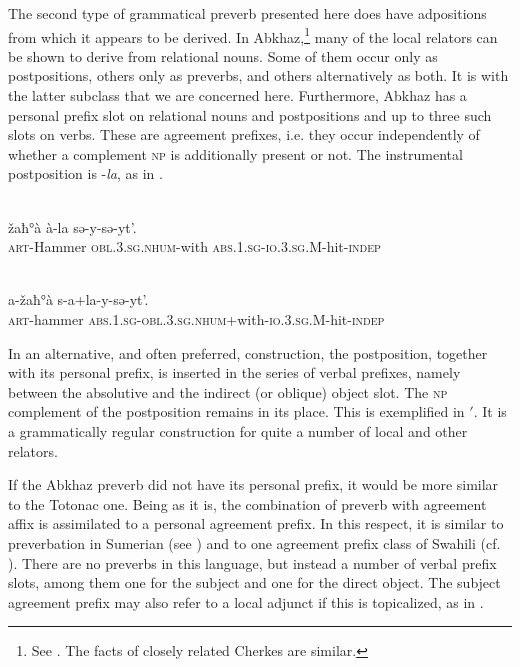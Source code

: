 The second type of grammatical preverb presented here does have adpositions from which it appears to be derived. In Abkhaz,\footnote{See \citet[113--149]{Hewitt1979}. The facts of closely related Cherkes are similar.} many of the local relators can be shown to derive from relational nouns. Some of them occur only as postpositions, others only as preverbs, and others alternatively as both. It is with the latter subclass that we are concerned here. Furthermore, Abkhaz has a personal prefix slot on relational nouns and postpositions and up to three such slots on verbs. These are agreement prefixes, i.e. they occur independently of whether a complement \textsc{np} is additionally present or not. The instrumental postposition is -\textit{la}, as in .

\ea\label{ex:E83}
\\
 \gll žaħ°à  à-la  sə-y-sə-yt'.\\
 \textsc{art}-Hammer  \textsc{obl}.3.\textsc{sg}.\textsc{nhum}-with  \textsc{abs}.1.\textsc{sg}-\textsc{io}.3.\textsc{sg}.M-hit-\textsc{indep}\\
\\
\z
\noindent \begin{exe} 
\gll a-žaħ°à  s-a+la-y-sə-yt'.\\
 \textsc{art}-hammer \textsc{abs}.1.\textsc{sg}-\textsc{obl}.3.\textsc{sg}.\textsc{nhum}+with-\textsc{io}.3.\textsc{sg}.M-hit-\textsc{indep}\\
\end{exe}

\noindent In an alternative, and often preferred, construction, the postposition, together with its personal prefix, is inserted in the series of verbal prefixes, namely between the absolutive and the indirect (or oblique) object slot. The \textsc{np} complement of the postposition remains in its place. This is exemplified in $'$. It is a grammatically regular construction for quite a number of local and other relators.

If the Abkhaz preverb did not have its personal prefix, it would be more similar to the Totonac one. Being as it is, the combination of preverb with agreement affix is assimilated to a personal agreement prefix. In this respect, it is similar to preverbation in Sumerian (see \citealt[46--49, 59f]{Falkenstein1959}) and to one agreement prefix class of Swahili (cf. \citealt[48]{Kahr1975}). There are no preverbs in this language, but instead a number of verbal prefix slots, among them one for the subject and one for the direct object. The subject agreement prefix may also refer to a local adjunct if this is topicalized, as in .

